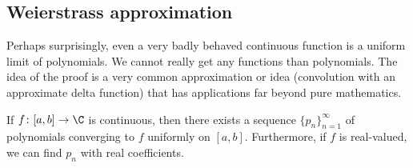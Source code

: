 
\subsection{Weierstrass approximation}

Perhaps surprisingly, even a very badly behaved continuous function is
a uniform limit of polynomials.
We cannot really get any 
functions than polynomials.
The idea of the proof is a very common approximation or  idea
(convolution with an approximate delta function) that has applications
far beyond pure mathematics.

\begin{thm}
If $f \colon [a,b] \to \C$ is continuous, then there exists a sequence
$\{ p_n \}_{n=1}^\infty$ of polynomials converging to $f$ uniformly on $[a,b]$.
Furthermore, if $f$ is real-valued, we can find $p_n$ with real coefficients.
\end{thm}

